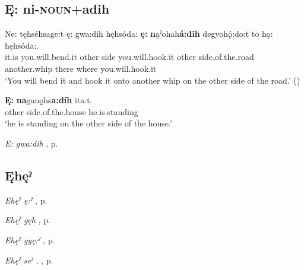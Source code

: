 \subsection*{\textbf{Ę: ni-\textsc{noun}+adih} } \label{p:[ę: ni-noun+adih]}

\ea
\label{ex:enpart5}
\gll Ne: tęhséhsage:t ę: gwa:dih hęhsóda: \textbf{ę:} \textbf{n}a̱ˀohah\textbf{á:dih} degyohǫ́:do:t to hǫ: hęhsóda:.\\
it.is you.will.bend.it other side you.will.hook.it other side.of.the.road another.whip there where you.will.hook.it\\
\glt ‘You will bend it and hook it onto another whip on the other side of the road.’ (\cite{mithun_how_1980})
\z

\ea
\label{ex:enpart6}
\gll \textbf{Ę:} \textbf{na}ganǫ̱hs\textbf{a:díh} ita:t.\\
other side.of.the.house he.is.standing\\
\glt ‘he is standing on the other side of the house.’
\z

\begin{CayugaRelated}
\item \textit{E: gwa:dih} , p. \pageref{p:[ę: gwa:dih]}
\end{CayugaRelated}

\subsection*{\textbf{Ęhęˀ} } \label{p:[ęhęˀ]}

\begin{CayugaRelated}
\item \textit{Ehęˀ ę:ˀ} , p. \pageref{p:[ęhęˀ ę:ˀ]}\\
\item \textit{Ehęˀ gęh} , p. \pageref{p:[ęhęˀ gęh]}\\
\item \textit{Ehęˀ gyę:ˀ} , p. \pageref{p:[ęhęˀ gyę:ˀ]}\\
\item \textit{Ehęˀ seˀ} , , p. \pageref{p:[ęhęˀ seˀ]}
\end{CayugaRelated}

